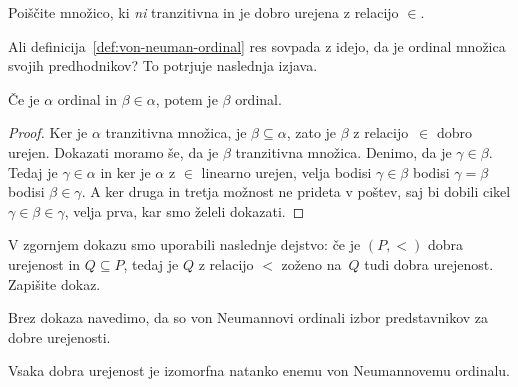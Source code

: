 \begin{vaja}
  Poiščite množico, ki \emph{ni} tranzitivna in je dobro urejena z relacijo $\in$.
\end{vaja}

Ali definicija~\ref{def:von-neuman-ordinal} res sovpada z idejo, da je ordinal množica svojih predhodnikov? To potrjuje naslednja izjava.

\begin{izjava}
  Če je $\alpha$ ordinal in $\beta \in \alpha$, potem je $\beta$ ordinal.
\end{izjava}

\begin{proof}
  Ker je $\alpha$ tranzitivna množica, je $\beta \subseteq \alpha$, zato je $\beta$ z relacijo~$\in$ dobro urejen. Dokazati moramo še, da je $\beta$ tranzitivna množica. Denimo, da je $\gamma \in \beta$.
  Tedaj je $\gamma \in \alpha$ in ker je $\alpha$ z $\in$ linearno urejen, velja bodisi $\gamma \in \beta$ bodisi $\gamma = \beta$ bodisi $\beta \in \gamma$. A ker druga in tretja možnost ne prideta v poštev, saj bi dobili cikel $\gamma \in \beta \in \gamma$, velja prva, kar smo želeli dokazati.
\end{proof}

\begin{vaja}
  V zgornjem dokazu smo uporabili naslednje dejstvo: če je $(P, {<})$ dobra urejenost in $Q \subseteq P$, tedaj je $Q$ z relacijo $<$ zoženo na~$Q$ tudi dobra urejenost. Zapišite dokaz.
\end{vaja}

Brez dokaza navedimo, da so von Neumannovi ordinali izbor predstavnikov za dobre urejenosti.

\begin{izrek}
  Vsaka dobra urejenost je izomorfna natanko enemu von Neumannovemu ordinalu.
\end{izrek}

